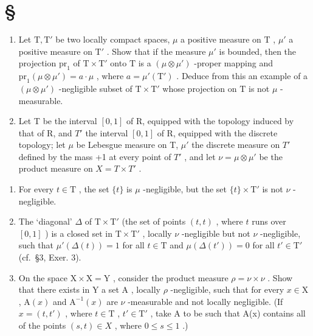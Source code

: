\section*{\texorpdfstring{\S\CurrentExerciseGroup}{Section \CurrentExerciseGroup}}
{}

\begin{enumerate}
\def\labelenumi{\arabic{enumi})}
\item
  Let \(\mathrm{T}, \mathrm{T}'\) be two locally compact spaces, \(\mu\) a positive measure on \(\mathrm{T}\) , \(\mu'\) a positive measure on \(\mathrm{T}'\) . Show that if the measure \(\mu'\) is bounded, then the projection \(\mathrm{pr}_1\) of \(\mathrm{T} \times \mathrm{T}'\) onto \(\mathrm{T}\) is a \((\mu \otimes \mu')\) -proper mapping and \(\mathrm{pr}_1(\mu \otimes \mu') = a \cdot \mu\) , where \(a = \mu'(\mathrm{T}')\) . Deduce from this an example of a \((\mu \otimes \mu')\) -negligible subset of \(\mathrm{T} \times \mathrm{T}'\) whose projection on \(\mathrm{T}\) is not \(\mu\) -measurable.
\item
  Let T be the interval \([0,1]\) of R, equipped with the topology induced by that of R, and \(T'\) the interval \([0,1]\) of R, equipped with the discrete topology; let \(\mu\) be Lebesgue measure on T, \(\mu'\) the discrete measure on \(T'\) defined by the mass +1 at every point of \(T'\) , and let \(\nu = \mu \otimes \mu'\) be the product measure on \(X = T \times T'\) .
\end{enumerate}

\begin{enumerate}
\def\labelenumi{\alph{enumi})}
\item
  For every \(t \in \mathrm{T}\) , the set \(\{t\}\) is \(\mu\) -negligible, but the set \(\{t\} \times \mathrm{T}'\) is not \(\nu\) -negligible.
\item
  The `diagonal' \(\Delta\) of \(\mathrm{T} \times \mathrm{T}'\) (the set of points \((t, t)\) , where \(t\) runs over \([0, 1]\) ) is a closed set in \(\mathrm{T} \times \mathrm{T}'\) , locally \(\nu\) -negligible but not \(\nu\) -negligible, such that \(\mu'(\Delta(t)) = 1\) for all \(t \in \mathrm{T}\) and \(\mu(\Delta(t')) = 0\) for all \(t' \in \mathrm{T}'\) (cf.~§3, Exer. 3).
\item
  On the space \(\mathrm{X} \times \mathrm{X} = \mathrm{Y}\) , consider the product measure \(\rho = \nu \times \nu\) . Show that there exists in \(\mathrm{Y}\) a set \(\mathrm{A}\) , locally \(\rho\) -negligible, such that for every \(x \in \mathrm{X}\) , \(\mathrm{A}(x)\) and \(\mathrm{A}^{-1}(x)\) are \(\nu\) -measurable and not locally negligible. (If \(x = (t, t')\) , where \(t \in \mathrm{T}\) , \(t' \in \mathrm{T}'\) , take A to be such that A(x) contains all of the points \((s, t) \in X\) , where \(0 \leqslant s \leqslant 1\) .)
\end{enumerate}

